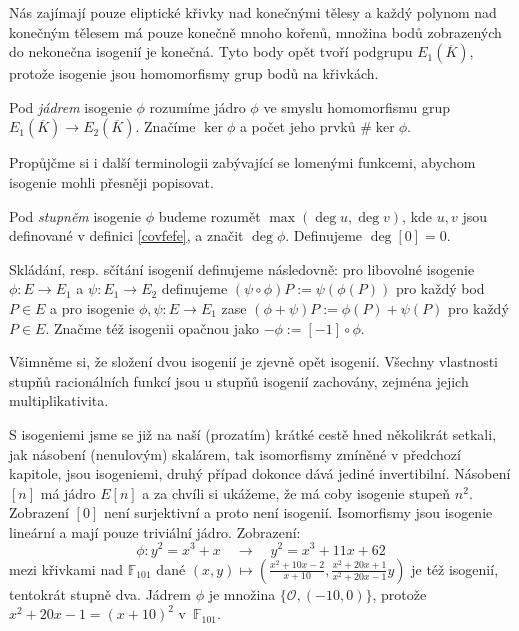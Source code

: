 \documentclass[12pt]{report}
\begin{document}
Nás zajímají pouze eliptické křivky nad konečnými tělesy a každý polynom nad konečným tělesem má pouze konečně mnoho kořenů, množina bodů zobrazených do nekonečna isogenií je konečná. Tyto body opět tvoří podgrupu $E_1 (\overline{K})$, protože isogenie jsou homomorfismy grup bodů na křivkách.

\begin{definice}
Pod \textit{jádrem} isogenie $\phi$ rozumíme jádro $\phi$ ve smyslu homomorfismu grup $E_1 (\overline{K})\longrightarrow E_2(\overline{K})$. Značíme $\ker \phi$ a počet jeho prvků $\# \ker \phi$. 
\end{definice}

Propůjčme si i další terminologii zabývající se lomenými funkcemi, abychom isogenie mohli přesněji popisovat.

\begin{definice}
Pod \textit{stupněm} isogenie $\phi$ budeme rozumět $\max (\deg u, \deg v)$, kde $u,v$ jsou definované v definici \ref{covfefe}, a značit $\deg \phi$. Definujeme $\deg [0] = 0$. 
\end{definice}
 
\begin{znaceni}
Skládání, resp. sčítání isogenií definujeme následovně: pro libovolné isogenie $\phi : E \longrightarrow E_1$ a $\psi : E_1 \longrightarrow E_2$ definujeme $(\psi \circ \phi) P  := \psi(\phi( P))$ pro každý bod $P \in E$ a pro isogenie $\phi,\psi : E \longrightarrow E_1$ zase $(\phi + \psi)P := \phi(P)+\psi(P)$ pro každý $P \in E$. Značme též isogenii opačnou jako $- \phi := [-1] \circ \phi$.
\end{znaceni}

Všimněme si, že složení dvou isogenií je zjevně opět isogenií. Všechny vlastnosti stupňů racionálních funkcí jsou u stupňů isogenií zachovány, zejména jejich multiplikativita.


S isogeniemi jsme se již na naší (prozatím) krátké cestě hned několikrát setkali, jak násobení (nenulovým) skalárem, tak isomorfismy zmíněné v předchozí kapitole, jsou isogeniemi, druhý případ dokonce dává jediné invertibilní. Násobení $[n]$ má jádro $E[n]$ a za chvíli si ukážeme, že má coby isogenie stupeň $n^2$. Zobrazení $[0]$ není surjektivní a proto není isogenií. Isomorfismy jsou isogenie lineární a mají pouze triviální jádro. Zobrazení:
\begin{equation*}
\phi : y^2 = x^3+x \quad \longrightarrow \quad y^2 =  x^3 + 11x + 62
\end{equation*}
mezi křivkami nad $\mathbb{F}_{101}$ dané $(x,y) \mapsto \left(\frac{x^2 + 10x - 2}{x+10},\frac{x^2  + 20x + 1}{x^2 + 20x - 1} y\right)$ je též isogenií, tentokrát stupně dva. Jádrem $\phi$ je množina $\lbrace \mathcal{O},(-10,0) \rbrace$, protože $x^2 + 20x - 1 = (x+10)^2$ v~$\mathbb{F}_{101}$.
\end{document}
